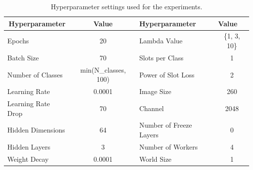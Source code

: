 \begin{table}[!h]
\centering
\begin{tabular}{lc|lc}
\hline
\multicolumn{1}{c}{\textbf{Hyperparameter}} & \textbf{Value}           & \textbf{Hyperparameter} & \multicolumn{1}{l}{\textbf{Value}} \\ \hline
Epochs                                      & 20                       & Lambda Value            & \{1, 3, 10\}       \\
Batch Size                                  & 70                       & Slots per Class         & 1                                  \\
Number of Classes                           & min(N_{classes}, 100) & Power of Slot Loss      & 2                                  \\
Learning Rate                               & 0.0001                   & Image Size              & 260                                \\
Learning Rate Drop                          & 70                       & Channel                 & 2048                               \\
Hidden Dimensions                           & 64                       & Number of Freeze Layers & 0                                  \\
Hidden Layers                               & 3                        & Number of Workers       & 4                                  \\
Weight Decay                                & 0.0001                   & World Size              & 1                                  \\ \hline
\end{tabular}
\caption{Hyperparameter settings used for the experiments.}
\label{tab:hyperparams}
\end{table}

